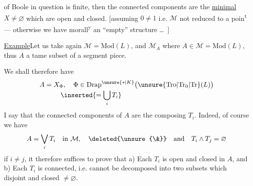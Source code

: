 of Boole in question is finite, then the connected components are the  \uline{minimal} $X\ne\varnothing$ which are open and closed. [assuming $0\ne1$
i.e. $\mathcal M$ not reduced to a poin\textsuperscript{t} --- otherwise we have  morall\textsuperscript{y} an ``empty'' structure \ldots\ ]

\uline{Example}\qquad Let us take again $\mathcal M=\mathrm{Mod}(L)$, and $\mathcal M_A$ where $A\in \mathcal M=\mathrm{Mod}(L)$, thus $A$ a tame subset of a segment piece.

We shall therefore have
\[
\begin{aligned}
A=X_{\Phi} &,\quad
\Phi\in{\operatorname{Drap}}^{\unsure{*|K}}
  \bigl(\unsure{\mathrm{Tro}|\mathrm{Tr}_0|\mathrm{Tr}}(L)\bigr)\\[-0.6ex]
 &\mkern-8mu\inserted{=\bigcup_i T_i}
\end{aligned}
\]
I say that the connected components of $A$ are the  composing $T_i$.
Indeed, of course we have
\[
A=\bigvee_i T_i\quad\text{in }\mathcal M,\quad\deleted{\unsure{\&}}\quad\text{and}\quad T_i\wedge T_j=\varnothing
\]
if $i\ne j$, it therefore suffices to prove that a) Each $T_i$ is open and closed in $A$, and b) Each $T_i$ is connected, i.e. cannot be decomposed into two subsets which  disjoint and  closed $\ne\varnothing$.
